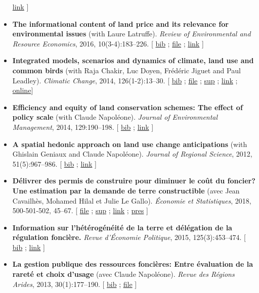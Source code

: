 \documentclass[11pt, a4paper]{./style}
\begin{document}
\begin{itemize}
\href{https://onlinelibrary.wiley.com/doi/abs/10.1111/geb.12514}{link} ]
\item \textbf{The informational content of land price and its relevance for
environmental issues} (with Laure Latruffe). \emph{Review of
Environmental and Resource Economics}, 2016, 10(3-4):183--226. [
\href{bib/RLP.bib}{bib} ; \href{doc/RLP-FILE.pdf}{file} ; \href{https://www.nowpublishers.com/article/Details/IRERE-0086}{link} ]
\item \textbf{Integrated models, scenarios and dynamics of climate, land use
and common birds} (with Raja Chakir, Luc Doyen, Frédéric Jiguet
and Paul Leadley). \emph{Climatic Change}, 2014, 126(1-2):13--30. [
\href{bib/CILE.bib}{bib} ; \href{doc/CILE-FILE.pdf}{file} ; \href{doc/CILE-SUP.pdf}{sup} ; \href{https://link.springer.com/article/10.1007/s10584-014-1202-4}{link} ; \href{https://mobilis-a4ac2.firebaseapp.com/index.html}{online}]
\item \textbf{Efficiency and equity of land conservation schemes: The effect
of policy scale} (with Claude Napoléone). \emph{Journal of
Environmental Management}, 2014, 129:190--198. [ \href{bib/EELC.bib}{bib} ; \href{http://www.sciencedirect.com/science/article/pii/S0301479713004829}{link} ]
\item \textbf{A spatial hedonic approach on land use change anticipations}
(with Ghislain Geniaux and Claude Napoléone). \emph{Journal of
Regional Science}, 2012, 51(5):967--986. [ \href{bib/SPHED.bib}{bib} ; \href{http://onlinelibrary.wiley.com/doi/10.1111/j.1467-9787.2011.00721.x/abstract}{link} ]
\end{itemize}

\label{sec:orgfd808a0}

\begin{itemize}
\item \textbf{Délivrer des permis de construire pour diminuer le coût du
foncier? Une estimation par la demande de terre constructible}
(avec Jean Cavailhès, Mohamed Hilal et Julie Le Gallo).
\emph{Économie et Statistiques}, 2018, 500-501-502, 45--67. [ \href{doc/PCPXf-FILE.pdf}{file} ;
\href{doc/PCPX-SUP.pdf}{sup} ; \href{https://insee.fr/fr/statistiques/3621977?sommaire=3622116}{link} ; \href{doc/PCPXf-PRES.pdf}{pres} ]
\item \textbf{Information sur l'hétérogénéité de la terre et délégation de la
régulation foncière.} \emph{Revue d'Économie Politique}, 2015,
125(3):453--474. [ \href{bib/IFHT.bib}{bib} ; \href{https://www.cairn.info/revue-d-economie-politique-2015-3-page-453.htm}{link} ]
\item \textbf{La gestion publique des ressources foncières: Entre évaluation
de la rareté et choix d'usage} (avec Claude Napoléone). \emph{Revue
des Régions Arides}, 2013, 30(1):177--190. [ \href{bib/GPRF.bib}{bib} ; \href{https://www.researchgate.net/profile/Claude\_Napoleone/publication/268075060\_La\_gestion\_publique\_des\_ressources\_foncieres\_entre\_evaluation\_de\_la\_rarete\_et\_choix\_d'usages/links/5460bdd20cf295b5616376de/La-gestion-publique-des-ressources-foncieres-entre-evaluation-de-la-rarete-et-choix-dusages.pdf}{file} ]
\end{itemize}
\end{document}
